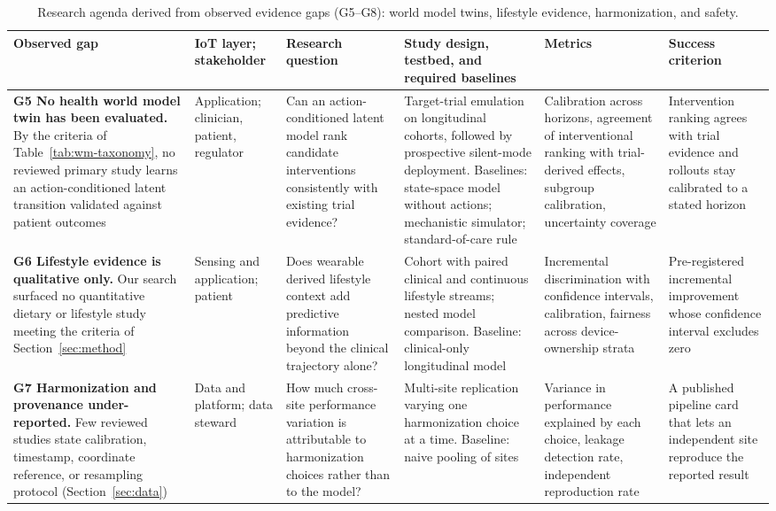 \documentclass[journal]{IEEEtran}
\newif\ifsubmission
\begin{document}
\ifsubmission\else
\begin{table}[p]
\centering
\caption{Research agenda derived from observed evidence gaps (G5--G8): world model twins, lifestyle evidence, harmonization, and safety.}
\label{tab:agenda-b}
\scriptsize
\setlength{\tabcolsep}{3pt}
\renewcommand{\arraystretch}{1.12}
\begin{tabularx}{\textwidth}{>{\raggedright\arraybackslash}p{3.4cm} >{\raggedright\arraybackslash}p{1.9cm} >{\raggedright\arraybackslash}X >{\raggedright\arraybackslash}X >{\raggedright\arraybackslash}p{2.9cm} >{\raggedright\arraybackslash}p{3.0cm}}
\toprule
\textbf{Observed gap} & \textbf{IoT layer; stakeholder} & \textbf{Research question} & \textbf{Study design, testbed, and required baselines} & \textbf{Metrics} & \textbf{Success criterion} \\
\midrule
\textbf{G5 No health world model twin has been evaluated.} By the criteria of Table~\ref{tab:wm-taxonomy}, no reviewed primary study learns an action-conditioned latent transition validated against patient outcomes & Application; clinician, patient, regulator & Can an action-conditioned latent model rank candidate interventions consistently with existing trial evidence? & Target-trial emulation on longitudinal cohorts, followed by prospective silent-mode deployment. Baselines: state-space model without actions; mechanistic simulator; standard-of-care rule & Calibration across horizons, agreement of interventional ranking with trial-derived effects, subgroup calibration, uncertainty coverage & Intervention ranking agrees with trial evidence and rollouts stay calibrated to a stated horizon \\
\addlinespace[3pt]
\textbf{G6 Lifestyle evidence is qualitative only.} Our search surfaced no quantitative dietary or lifestyle study meeting the criteria of Section~\ref{sec:method} & Sensing and application; patient & Does wearable derived lifestyle context add predictive information beyond the clinical trajectory alone? & Cohort with paired clinical and continuous lifestyle streams; nested model comparison. Baseline: clinical-only longitudinal model & Incremental discrimination with confidence intervals, calibration, fairness across device-ownership strata & Pre-registered incremental improvement whose confidence interval excludes zero \\
\addlinespace[3pt]
\textbf{G7 Harmonization and provenance under-reported.} Few reviewed studies state calibration, timestamp, coordinate reference, or resampling protocol (Section~\ref{sec:data}) & Data and platform; data steward & How much cross-site performance variation is attributable to harmonization choices rather than to the model? & Multi-site replication varying one harmonization choice at a time. Baseline: naive pooling of sites & Variance in performance explained by each choice, leakage detection rate, independent reproduction rate & A published pipeline card that lets an independent site reproduce the reported result \\

\end{tabularx}
\end{table}
\end{document}
